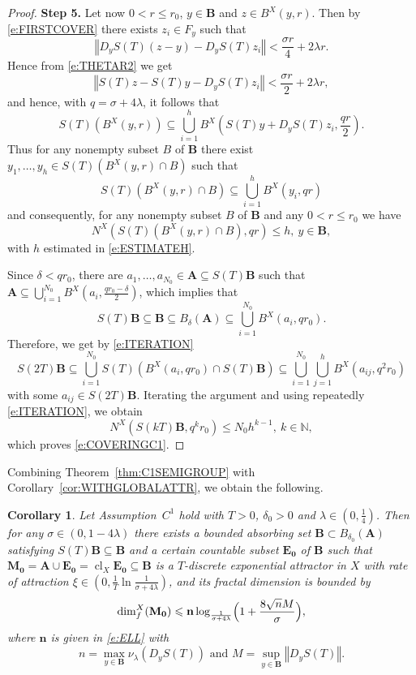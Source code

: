 \documentclass[a4paper,12pt,reqno]{amsart}
\theoremstyle{plain}
\newtheorem{cor}[lem]{Corollary}
\theoremstyle{definition}
\numberwithin{equation}{section}
\newcommand{\N}{\mathbb{N}}
\newcommand{\norm}[1]{\left\Vert#1\right\Vert}
\newcommand{\dimf}{\operatorname{dim}_{f}}
\newcommand{\cl}{\operatorname{cl}}
\renewcommand{\leq}{\leqslant}
\begin{document}
\begin{proof}
\textbf{Step 5.} 
Let now $0<r\leq r_0$, $y\in\mathbf{B}$ and $z\in B^{X}(y,r)$. Then by \eqref{e:FIRSTCOVER} there exists $z_i\in F_y$ such that
$$\norm{D_y S(T)(z-y)-D_y S(T) z_i}<\frac{\sigma r}{4}+2\lambda r.$$
Hence from \eqref{e:THETAR2} we get
$$\norm{S(T)z-S(T)y-D_y S(T) z_i}<\frac{\sigma r}{2}+2\lambda r,$$
and hence, with $q=\sigma+4\lambda$, it follows that
$$S(T)(B^{X}(y,r))\subseteq\bigcup_{i=1}^{h}B^{X}(S(T)y+D_y S(T) z_i,\frac{qr}{2}).$$
Thus for any nonempty subset $B$ of $\mathbf{B}$ there exist $y_1,\ldots,y_h\in S(T)(B^{X}(y,r)\cap B)$ such that
$$S(T)(B^{X}(y,r)\cap B)\subseteq\bigcup_{i=1}^{h}B^{X}(y_i,qr)$$
and consequently, for any nonempty subset $B$ of $\mathbf{B}$ and any $0<r\leq r_0$ we have
\begin{equation}\label{e:ITERATION}
N^{X}(S(T)(B^{X}(y,r)\cap B),q r)\leq h,\ y\in\mathbf{B},
\end{equation}
with $h$ estimated in \eqref{e:ESTIMATEH}.

Since $\delta<qr_0$, there are $a_1,\ldots,a_{N_0}\in\mathbf{A}\subseteq S(T)\mathbf{B}$ such that $\mathbf{A}\subseteq\bigcup\limits_{i=1}^{N_0}B^{X}(a_i,\frac{qr_0-\delta}{2})$,
which implies that
$$S(T)\mathbf{B}\subseteq \mathbf{B}\subseteq B_{\delta}(\mathbf{A})\subseteq\bigcup_{i=1}^{N_0}B^{X}(a_i,qr_0).$$
Therefore, we get by \eqref{e:ITERATION}
$$S(2T)\mathbf{B}\subseteq\bigcup_{i=1}^{N_0}S(T)(B^{X}(a_i,qr_0)\cap S(T)\mathbf{B})\subseteq\bigcup_{i=1}^{N_0}\bigcup_{j=1}^{h}B^{X}(a_{ij},q^2r_0)$$
with some $a_{ij}\in S(2T)\mathbf{B}$.
Iterating the argument and using repeatedly \eqref{e:ITERATION}, we obtain
$$N^{X}(S(kT)\mathbf{B},q^{k}r_0)\leq N_0h^{k-1},\ k\in\N,$$
which proves \eqref{e:COVERINGC1}.
\end{proof} 

Combining Theorem~\ref{thm:C1SEMIGROUP} with Corollary~\ref{cor:WITHGLOBALATTR}, we obtain the following.

\begin{cor}
Let Assumption~$C^1$ hold with $T>0$, $\delta_0>0$ and $\lambda\in(0,\frac{1}{4})$.
Then for any $\sigma\in(0,1-4\lambda)$ there exists a bounded absorbing set $\mathbf{B}\subset B_{\delta_0}(\mathbf{A})$ satisfying $S(T)\mathbf{B}\subseteq\mathbf{B}$ and a certain countable subset $\mathbf{E_0}$ of $\mathbf{B}$ such that $\mathbf{M_0}=\mathbf{A}\cup\mathbf{E_0}=\cl_X\mathbf{E_0}\subseteq\mathbf{B}$ is a $T$-discrete exponential attractor in $X$
with rate of attraction $\xi\in(0,\frac{1}{T}\ln{\frac{1}{\sigma+4\lambda}})$, and its fractal dimension is bounded by
$$\dimf^{X}(\mathbf{M_0})\leq\mathbf{n}\log_{\frac{1}{\sigma+4\lambda}}\Bigl(1+\frac{8\sqrt{n}M}{\sigma}\Bigr),$$
where $\mathbf{n}$ is given in \eqref{e:ELL} with
$$n=\max_{y\in\mathbf{B}}\nu_{\lambda}(D_y S(T))\text{ and }M=\sup_{y\in\mathbf{B}}\norm{D_y S(T)}.$$
\end{cor}
\end{document}
